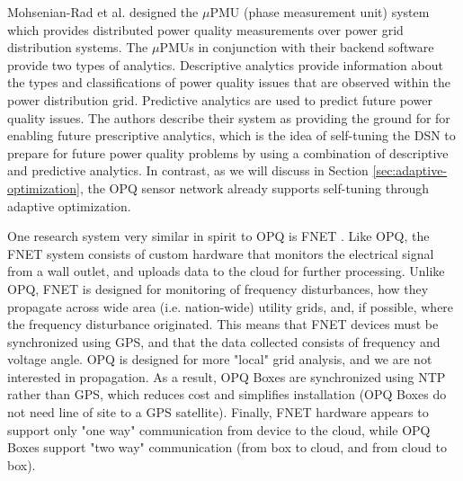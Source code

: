 Mohsenian-Rad et al. \cite{mohsenian-rad_distribution_2018} designed the $\mu$PMU (phase measurement unit) system which provides distributed power quality measurements over power grid distribution systems. The $\mu$PMUs in conjunction with their backend software provide two types of analytics. Descriptive analytics provide information about the types and classifications of power quality issues that are observed within the power distribution grid. Predictive analytics are used to predict future power quality issues. The authors describe their system as providing the ground for for enabling future prescriptive analytics, which is the idea of self-tuning the DSN to prepare for future power quality problems by using a combination of descriptive and predictive analytics. In contrast, as we will discuss in Section \ref{sec:adaptive-optimization}, the OPQ sensor network already supports self-tuning through adaptive optimization.

One research system very similar in spirit to OPQ is FNET \cite{liu_distribution_2017}. Like OPQ, the FNET system consists of custom hardware that monitors the electrical signal from a wall outlet, and uploads data to the cloud for further processing. Unlike OPQ, FNET is designed for monitoring of frequency disturbances, how they propagate across wide area (i.e. nation-wide) utility grids, and, if possible, where the frequency disturbance originated. This means that FNET devices must be synchronized using GPS, and that the data collected consists of frequency and voltage angle. OPQ is designed for more "local" grid analysis, and we are not interested in propagation. As a result, OPQ Boxes are synchronized using NTP rather than GPS, which reduces cost and simplifies installation (OPQ Boxes do not need line of site to a GPS satellite). Finally, FNET hardware appears to support only "one way" communication from device to the cloud, while OPQ Boxes support "two way" communication (from box to cloud, and from cloud to box).
